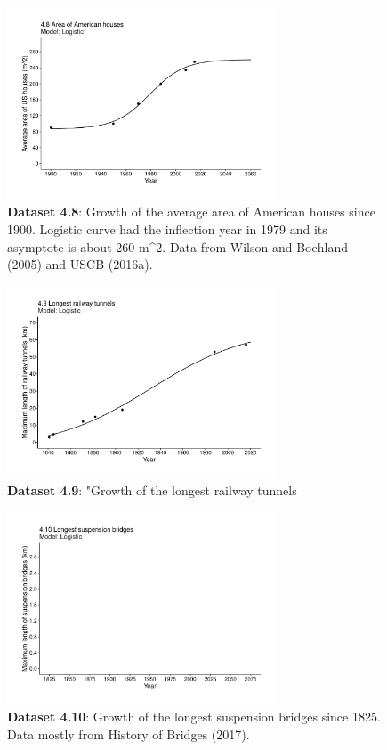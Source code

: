 \documentclass[aps,rmp,preprint,superscriptaddress,10pt,onecolumn]{article}
\begin{document}
\begin{figure}[h]
\includegraphics[width=8cm]{output/figs-ggplot/4.8.pdf}
\caption{\textbf{Dataset 4.8}: Growth of the average area of American houses since 1900. Logistic curve had the inflection year in 1979 and its asymptote is about 260 m^2. Data from Wilson and Boehland (2005) and USCB (2016a).}
\end{figure}
	
\begin{figure}[h]
\includegraphics[width=8cm]{output/figs-ggplot/4.9.pdf}
\caption{\textbf{Dataset 4.9}: "Growth of the longest railway tunnels}
\end{figure}
	
\begin{figure}[h]
\includegraphics[width=8cm]{output/figs-ggplot/4.10.pdf}
\caption{\textbf{Dataset 4.10}: Growth of the longest suspension bridges since 1825. Data mostly from History of Bridges (2017).}
\end{figure}
	
\end{document}
